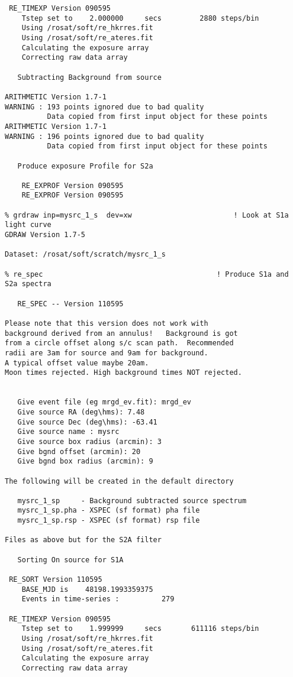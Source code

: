 \begin{small}
\begin{verbatim}
 RE_TIMEXP Version 090595      
    Tstep set to    2.000000     secs         2880 steps/bin
    Using /rosat/soft/re_hkrres.fit
    Using /rosat/soft/re_ateres.fit
    Calculating the exposure array
    Correcting raw data array
 
   Subtracting Background from source 
 
ARITHMETIC Version 1.7-1
WARNING : 193 points ignored due to bad quality
          Data copied from first input object for these points
ARITHMETIC Version 1.7-1
WARNING : 196 points ignored due to bad quality
          Data copied from first input object for these points
 
   Produce exposure Profile for S2a
 
    RE_EXPROF Version 090595
    RE_EXPROF Version 090595

% grdraw inp=mysrc_1_s  dev=xw                        ! Look at S1a light curve
GDRAW Version 1.7-5

Dataset: /rosat/soft/scratch/mysrc_1_s

% re_spec                                         ! Produce S1a and S2a spectra
 
   RE_SPEC -- Version 110595
 
Please note that this version does not work with 
background derived from an annulus!   Background is got
from a circle offset along s/c scan path.  Recommended 
radii are 3am for source and 9am for background. 
A typical offset value maybe 20am. 
Moon times rejected. High background times NOT rejected.
 
 
   Give event file (eg mrgd_ev.fit): mrgd_ev
   Give source RA (deg\hms): 7.48
   Give source Dec (deg\hms): -63.41
   Give source name : mysrc
   Give source box radius (arcmin): 3
   Give bgnd offset (arcmin): 20
   Give bgnd box radius (arcmin): 9
 
The following will be created in the default directory
 
   mysrc_1_sp     - Background subtracted source spectrum
   mysrc_1_sp.pha - XSPEC (sf format) pha file
   mysrc_1_sp.rsp - XSPEC (sf format) rsp file
 
Files as above but for the S2A filter
 
   Sorting On source for S1A

 RE_SORT Version 110595   
    BASE_MJD is    48198.1993359375     
    Events in time-series :          279

 RE_TIMEXP Version 090595      
    Tstep set to    1.999999     secs       611116 steps/bin
    Using /rosat/soft/re_hkrres.fit
    Using /rosat/soft/re_ateres.fit
    Calculating the exposure array
    Correcting raw data array
 

\end{verbatim}
\end{small}
